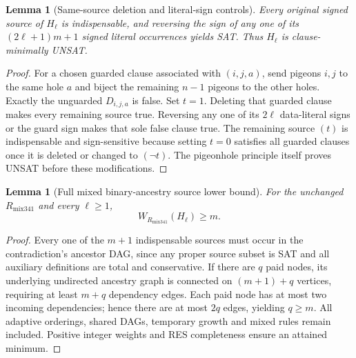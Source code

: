 \documentclass[11pt]{article}
\newtheorem{lemma}[theorem]{Lemma}
\begin{document}
\begin{lemma}[Same-source deletion and literal-sign controls]
Every original signed source of $H_\ell$ is indispensable, and reversing the sign of any one of its $(2\ell+1)m+1$ signed literal occurrences yields SAT. Thus $H_\ell$ is clause-minimally UNSAT.
\end{lemma}
\begin{proof}
For a chosen guarded clause associated with $(i,j,a)$, send pigeons $i,j$ to the same hole $a$ and biject the remaining $n-1$ pigeons to the other holes. Exactly the unguarded $D_{i,j,a}$ is false. Set $t=1$. Deleting that guarded clause makes every remaining source true. Reversing any one of its $2\ell$ data-literal signs or the guard sign makes that sole false clause true. The remaining source $(t)$ is indispensable and sign-sensitive because setting $t=0$ satisfies all guarded clauses once it is deleted or changed to $(\neg t)$. The pigeonhole principle itself proves UNSAT before these modifications.
\end{proof}
\begin{lemma}[Full mixed binary-ancestry source lower bound]
For the unchanged $R_{\mathrm{mix341}}$ and every $\ell\ge1$,
\[
\boxed{W_{R_{\mathrm{mix341}}}(H_\ell)\ge m.}
\]
\end{lemma}
\begin{proof}
Every one of the $m+1$ indispensable sources must occur in the contradiction's ancestor DAG, since any proper source subset is SAT and all auxiliary definitions are total and conservative. If there are $q$ paid nodes, its underlying undirected ancestry graph is connected on $(m+1)+q$ vertices, requiring at least $m+q$ dependency edges. Each paid node has at most two incoming dependencies; hence there are at most $2q$ edges, yielding $q\ge m$. All adaptive orderings, shared DAGs, temporary growth and mixed rules remain included. Positive integer weights and RES completeness ensure an attained minimum.
\end{proof}
\end{document}
